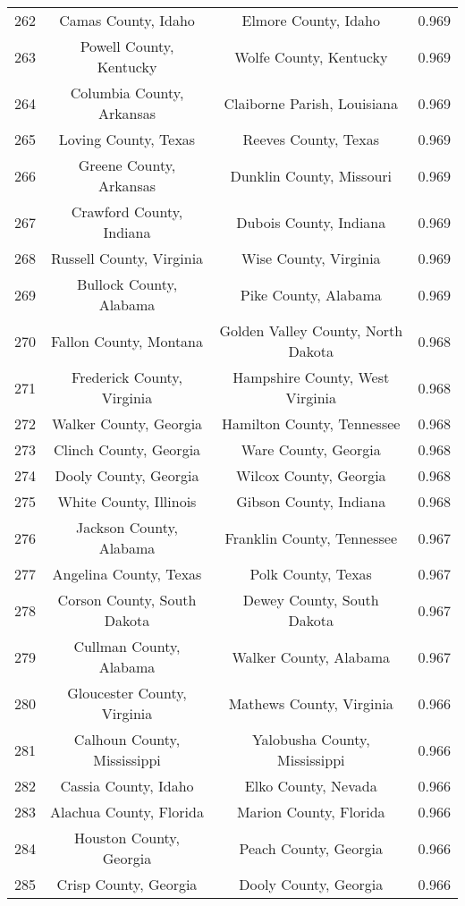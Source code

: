 \begin{longtable}{cccc}
  262 & Camas County, Idaho & Elmore County, Idaho & 0.969 \\ 
  263 & Powell County, Kentucky & Wolfe County, Kentucky & 0.969 \\ 
  264 & Columbia County, Arkansas & Claiborne Parish, Louisiana & 0.969 \\ 
  265 & Loving County, Texas & Reeves County, Texas & 0.969 \\ 
  266 & Greene County, Arkansas & Dunklin County, Missouri & 0.969 \\ 
  267 & Crawford County, Indiana & Dubois County, Indiana & 0.969 \\ 
  268 & Russell County, Virginia & Wise County, Virginia & 0.969 \\ 
  269 & Bullock County, Alabama & Pike County, Alabama & 0.969 \\ 
  270 & Fallon County, Montana & Golden Valley County, North Dakota & 0.968 \\ 
  271 & Frederick County, Virginia & Hampshire County, West Virginia & 0.968 \\ 
  272 & Walker County, Georgia & Hamilton County, Tennessee & 0.968 \\ 
  273 & Clinch County, Georgia & Ware County, Georgia & 0.968 \\ 
  274 & Dooly County, Georgia & Wilcox County, Georgia & 0.968 \\ 
  275 & White County, Illinois & Gibson County, Indiana & 0.968 \\ 
  276 & Jackson County, Alabama & Franklin County, Tennessee & 0.967 \\ 
  277 & Angelina County, Texas & Polk County, Texas & 0.967 \\ 
  278 & Corson County, South Dakota & Dewey County, South Dakota & 0.967 \\ 
  279 & Cullman County, Alabama & Walker County, Alabama & 0.967 \\ 
  280 & Gloucester County, Virginia & Mathews County, Virginia & 0.966 \\ 
  281 & Calhoun County, Mississippi & Yalobusha County, Mississippi & 0.966 \\ 
  282 & Cassia County, Idaho & Elko County, Nevada & 0.966 \\ 
  283 & Alachua County, Florida & Marion County, Florida & 0.966 \\ 
  284 & Houston County, Georgia & Peach County, Georgia & 0.966 \\ 
  285 & Crisp County, Georgia & Dooly County, Georgia & 0.966 \\ 

\end{longtable}
